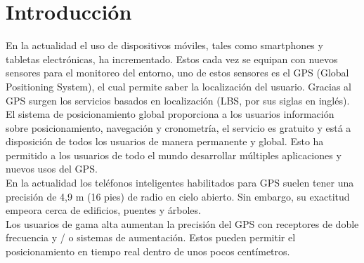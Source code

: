 \chapter{Introducción}

En la actualidad el uso de dispositivos móviles, tales como smartphones y tabletas electrónicas, ha incrementado. Estos cada vez se equipan con nuevos sensores para el monitoreo del entorno, uno de estos sensores es el GPS (Global Positioning System), el cual permite saber la localización del usuario. Gracias al GPS surgen los servicios basados en localización (LBS, por sus siglas en inglés).\\

El sistema de posicionamiento global proporciona a los usuarios información sobre posicionamiento, navegación y cronometría, el servicio es gratuito y está a disposición de todos los usuarios de manera permanente y global. Esto  ha permitido a los usuarios de todo el mundo desarrollar múltiples aplicaciones y nuevos usos del GPS.\\

En la actualidad los teléfonos inteligentes habilitados para GPS suelen tener una precisión de 4,9 m (16 pies) de radio en cielo abierto. Sin embargo, su exactitud empeora cerca de edificios, puentes y árboles.\\

Los usuarios de gama alta aumentan la precisión del GPS con receptores de doble frecuencia y / o sistemas de aumentación. Estos pueden permitir el posicionamiento en tiempo real dentro de unos pocos centímetros.\cite{gps}



